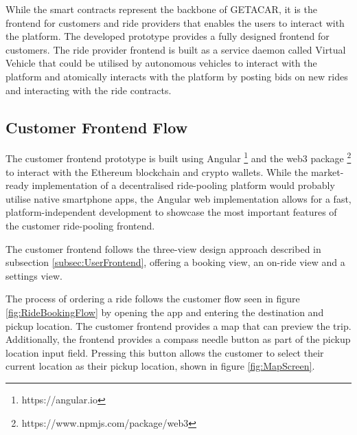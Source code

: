 While the smart contracts represent the backbone of GETACAR, it is the frontend for customers and ride providers that enables the users to interact with the platform. The developed prototype provides a fully designed frontend  for customers. The ride provider frontend is built as a service daemon called Virtual Vehicle that could be utilised by autonomous vehicles to interact with the platform and atomically interacts with the platform by posting bids on new rides and interacting with the ride contracts. 

\subsection{Customer Frontend Flow}
The customer frontend prototype is built using Angular \footnote{https://angular.io} and the web3 package \footnote{https://www.npmjs.com/package/web3} to interact with the Ethereum blockchain and crypto wallets. While the market-ready implementation of a decentralised ride-pooling platform would probably utilise native smartphone apps, the Angular web implementation allows for a fast, platform-independent development to showcase the most important features of the customer ride-pooling frontend. 

The customer frontend follows the three-view design approach described in subsection \ref{subsec:UserFrontend}, offering a booking view, an on-ride view and a settings view. 

The process of ordering a ride follows the customer flow seen in figure \ref{fig:RideBookingFlow} by opening the app and entering the destination and pickup location. The customer frontend provides a map that can preview the trip. Additionally, the frontend provides  a compass needle button as part of the pickup location input field. Pressing this button allows the customer to select their current location as their pickup location, shown in figure \ref{fig:MapScreen}.

